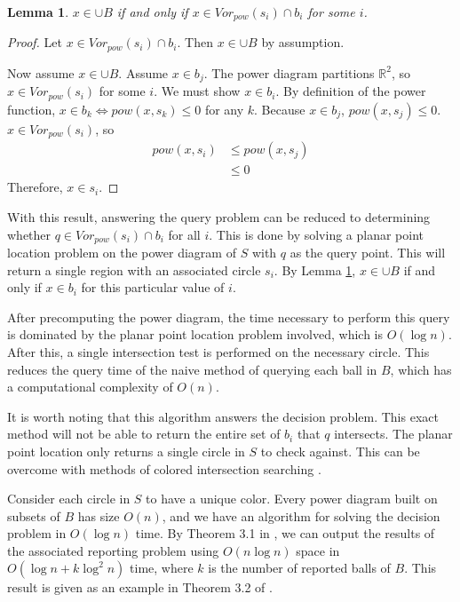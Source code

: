 \documentclass[a4paper, 11pt]{article}
\newtheorem{lemma}{Lemma}[section]
\newcommand{\R}{\mathbb{R}}
\begin{document}
\begin{lemma}
  \label{lem:pow_query}
  $x \in \cup B$ if and only if $x \in Vor_{pow}(s_i) \cap b_i$ for some $i$.
\end{lemma}
\begin{proof}
  Let $x \in Vor_{pow}(s_i) \cap b_i$. Then $x \in \cup B$ by assumption.

  Now assume $x \in \cup B$. Assume $x \in b_j$. The power diagram partitions $\R^2$, so $x \in Vor_{pow}(s_i)$ for some $i$. We must show $x \in
  b_i$. By definition of the power function, $x \in b_k \Leftrightarrow pow(x,s_k) \leq 0$ for any $k$. Because $x \in b_j$, $pow(x,s_j) \leq 0$. $x
  \in Vor_{pow}(s_i)$, so
  \begin{align*}
    pow(x,s_i) &\leq pow(x, s_j) \\
    &\leq 0
  \end{align*}
  Therefore, $x \in s_i$.
\end{proof}

With this result, answering the query problem can be reduced to determining whether $q \in Vor_{pow}(s_i) \cap b_i$ for all $i$. This is done by
solving a planar point location problem on the power diagram of $S$ with $q$ as the query point. This will return a single region with an associated
circle $s_i$. By Lemma \ref{lem:pow_query}, $x \in \cup B$ if and only if $x \in b_i$ for this particular value of $i$.

After precomputing the power diagram, the time necessary to perform this query is dominated by the planar point location problem involved, which is $O(\log n)$. After this, a single
intersection test is performed on the necessary circle. This reduces the query time of the naive method of querying each ball in $B$, which has a
computational complexity of $O(n)$.

It is worth noting that this algorithm answers the decision problem. This exact method will not be able to return the entire set of $b_i$ that $q$
intersects. The planar point location only returns a single circle in $S$ to check against. This can be overcome with methods of colored intersection
searching \cite{ravi}.

Consider each circle in $S$ to have a unique color. Every power diagram built on subsets of $B$ has size $O(n)$, and we have
an algorithm for solving the decision problem in $O(\log n)$ time. By Theorem 3.1 in \cite{ravi}, we can output the results of the associated reporting problem using $O(n
\log n)$ space in $O(\log n +k \log^2 n)$ time, where $k$ is the number of reported balls of $B$. This result is given as an example in Theorem 3.2 of
\cite{ravi}.
\end{document}
